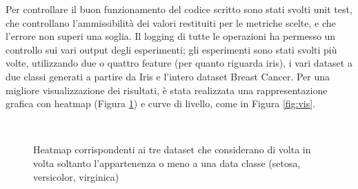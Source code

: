 \documentclass[oneside, openany]{book}
\begin{document}
	Per controllare il buon funzionamento del codice scritto sono stati svolti unit test, che controllano l'ammissibilità dei valori restituiti per le metriche scelte, e che l'errore non superi una soglia. Il logging di tutte le operazioni ha permesso un controllo sui vari output degli esperimenti; gli esperimenti sono stati svolti più volte, utilizzando due o quattro feature (per quanto riguarda iris), i vari dataset a due classi generati a partire da Iris e l'intero dataset Breast Cancer.
	Per una migliore visualizzazione dei risultati, è stata realizzata una rappresentazione grafica con heatmap (Figura \ref{fig:hm}) e curve di livello, come in Figura \ref{fig:vis}. 
	\begin{figure}[h!]
		\quad 
		\quad
		\\
		\caption{Heatmap corrispondenti ai tre dataset che considerano di volta in volta soltanto l'appartenenza o meno a una data classe (setosa, versicolor, virginica)}
		\label{fig:hm}
	\end{figure}
\end{document}
